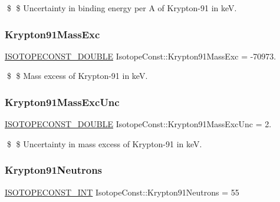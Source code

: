 \$ \$ Uncertainty in binding energy per A of Krypton-\/91 in keV. \mbox{\label{group___isotope_const-_krypton-_kr91_ga3374efa6b83ceeda756e5f5d825f04a9}} 
\subsubsection{\texorpdfstring{Krypton91\+Mass\+Exc}{Krypton91MassExc}}
{\footnotesize\ttfamily \mbox{\hyperlink{group___isotope_const-_macros_ga8f45a7272ce02c0b4c65c44636ed719a}{I\+S\+O\+T\+O\+P\+E\+C\+O\+N\+S\+T\+\_\+\+D\+O\+U\+B\+LE}} Isotope\+Const\+::\+Krypton91\+Mass\+Exc = -\/70973.}

\$ \$ Mass excess of Krypton-\/91 in keV. \mbox{\label{group___isotope_const-_krypton-_kr91_ga84c2da4f8574f244154ce41755933bf1}} 
\subsubsection{\texorpdfstring{Krypton91\+Mass\+Exc\+Unc}{Krypton91MassExcUnc}}
{\footnotesize\ttfamily \mbox{\hyperlink{group___isotope_const-_macros_ga8f45a7272ce02c0b4c65c44636ed719a}{I\+S\+O\+T\+O\+P\+E\+C\+O\+N\+S\+T\+\_\+\+D\+O\+U\+B\+LE}} Isotope\+Const\+::\+Krypton91\+Mass\+Exc\+Unc = 2.}

\$ \$ Uncertainty in mass excess of Krypton-\/91 in keV. \mbox{\label{group___isotope_const-_krypton-_kr91_gacdc6f3ce40f3280004d83dea43863faa}} 
\subsubsection{\texorpdfstring{Krypton91\+Neutrons}{Krypton91Neutrons}}
{\footnotesize\ttfamily \mbox{\hyperlink{group___isotope_const-_macros_ga5f18360b3e99483a35c32d789e62621c}{I\+S\+O\+T\+O\+P\+E\+C\+O\+N\+S\+T\+\_\+\+I\+NT}} Isotope\+Const\+::\+Krypton91\+Neutrons = 55}

